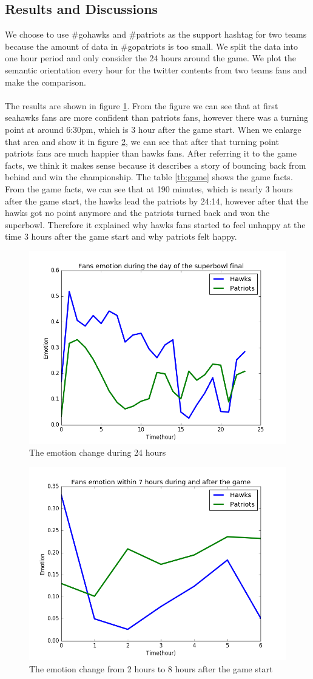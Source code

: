 \documentclass{article}
\begin{document}
\subsection{Results and Discussions}
We choose to use \#gohawks and \#patriots as the support hashtag for two teams because the amount of data in \#gopatriots is too small. We split the data into one hour period and only consider the 24 hours around the game. We plot the semantic orientation every hour for the twitter contents from two teams fans and make the comparison. \\
\\
The results are shown in figure \ref{fig:emotion24}. From the figure we can see that at first seahawks fans are more confident than patriots fans, however there was a turning point at around  6:30pm, which is 3 hour after the game start. When we enlarge that area and show it in figure \ref{fig:emotion6}, we can see that after that turning point patriots fans are much happier than hawks fans. After referring it to the game facts, we think it makes sense because it describes a story of bouncing back from behind and win the championship. The table \ref{tb:game} shows the game facts. From the game facts, we can see that at 190 minutes, which is nearly 3 hours after the game start, the hawks lead the patriots by 24:14, however after that the hawks got no point anymore and the patriots turned back and won the superbowl. Therefore it explained why hawks fans started to feel unhappy at the time 3 hours after the game start and why patriots felt happy.
\begin{figure}[htbp]
\centering
\includegraphics[width=.6\textwidth]{emotion24.png}
\caption{The emotion change during 24 hours}
\label{fig:emotion24}
\end{figure}

\begin{figure}[htbp]
\centering
\includegraphics[width=.6\textwidth]{emotion6.png}
\caption{The emotion change from 2 hours to 8 hours after the game start  }
\label{fig:emotion6}
\end{figure}
\end{document}

